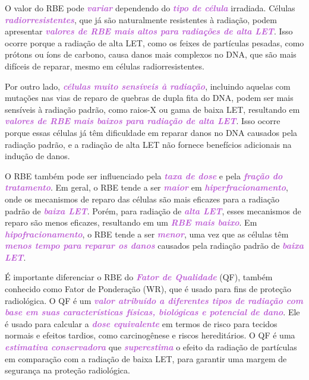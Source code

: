 \documentclass[11pt,a4paper]{article}
\begin{document}
	O valor do RBE pode \textcolor{MediumOrchid}{\textbf{\textit{variar}}} dependendo do \textcolor{MediumOrchid}{\textbf{\textit{tipo de célula}}} irradiada. Células \textcolor{MediumOrchid}{\textbf{\textit{radiorresistentes}}}, que já são naturalmente resistentes à radiação, podem apresentar \textcolor{MediumOrchid}{\textbf{\textit{valores de RBE mais altos para radiações de alta LET}}}. Isso ocorre porque a radiação de alta LET, como os feixes de partículas pesadas, como prótons ou íons de carbono, causa danos mais complexos no DNA, que são mais difíceis de reparar, mesmo em células radiorresistentes.

	Por outro lado, \textcolor{MediumOrchid}{\textbf{\textit{células muito sensíveis à radiação}}}, incluindo aquelas com mutações nas vias de reparo de quebras de dupla fita do DNA, podem ser mais sensíveis à radiação padrão, como raios-X ou gama de baixa LET, resultando em \textcolor{MediumOrchid}{\textbf{\textit{valores de RBE mais baixos para radiação de alta LET}}}. Isso ocorre porque essas células já têm dificuldade em reparar danos no DNA causados pela radiação padrão, e a radiação de alta LET não fornece benefícios adicionais na indução de danos.

	O RBE também pode ser influenciado pela \textcolor{MediumOrchid}{\textbf{\textit{taxa de dose}}} e pela \textcolor{MediumOrchid}{\textbf{\textit{fração do tratamento}}}. Em geral, o RBE tende a ser \textcolor{MediumOrchid}{\textbf{\textit{maior}}} em \textcolor{MediumOrchid}{\textbf{\textit{hiperfracionamento}}}, onde os mecanismos de reparo das células são mais eficazes para a radiação padrão de \textcolor{MediumOrchid}{\textbf{\textit{baixa LET}}}. Porém, para radiação de \textcolor{MediumOrchid}{\textbf{\textit{alta LET}}}, esses mecanismos de reparo são menos eficazes, resultando em um \textcolor{MediumOrchid}{\textbf{\textit{RBE mais baixo}}}. Em \textcolor{MediumOrchid}{\textbf{\textit{hipofracionamento}}}, o RBE tende a ser \textcolor{MediumOrchid}{\textbf{\textit{menor}}}, uma vez que as células têm \textcolor{MediumOrchid}{\textbf{\textit{menos tempo para reparar os danos}}} causados pela radiação padrão de \textcolor{MediumOrchid}{\textbf{\textit{baixa LET}}}.

	É importante diferenciar o RBE do \textcolor{MediumOrchid}{\textbf{\textit{Fator de Qualidade}}} (QF), também conhecido como Fator de Ponderação (WR), que é usado para fins de proteção radiológica. O QF é um \textcolor{MediumOrchid}{\textbf{\textit{valor atribuído a diferentes tipos de radiação com base em suas características físicas, biológicas e potencial de dano}}}. Ele é usado para calcular a \textcolor{MediumOrchid}{\textbf{\textit{dose equivalente}}} em termos de risco para tecidos normais e efeitos tardios, como carcinogênese e riscos hereditários. O QF é uma \textcolor{MediumOrchid}{\textbf{\textit{estimativa conservadora}}} que \textcolor{MediumOrchid}{\textbf{\textit{superestima}}} o efeito da radiação de partículas em comparação com a radiação de baixa LET, para garantir uma margem de segurança na proteção radiológica.
\end{document}
